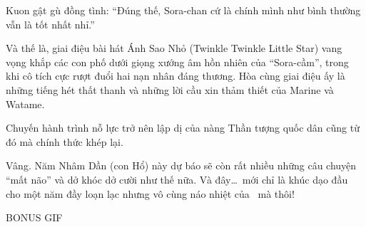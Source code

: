 \documentclass[../main.tex]{subfiles}
\begin{document}
Kuon gật gù đồng tình: ``Đúng thế, Sora-chan cứ là chính mình như bình thường vẫn là tốt nhất nhỉ.''

Và thế là, giai điệu bài hát Ánh Sao Nhỏ (Twinkle Twinkle Little Star) vang vọng khắp các con phố dưới giọng xướng âm hồn nhiên của ``Sora-cầm'', trong khi cô tích cực rượt đuổi hai nạn nhân đáng thương. Hòa cùng giai điệu ấy là những tiếng hét thất thanh và những lời cầu xin thảm thiết của Marine và Watame.

Chuyến hành trình nỗ lực trở nên lập dị của nàng Thần tượng quốc dân cũng từ đó mà chính thức khép lại.

Vâng. Năm Nhâm Dần (con Hổ) này dự báo sẽ còn rất nhiều những câu chuyện ``mất não'' và dở khóc dở cười như thế nữa. Và đây\dots\ mới chỉ là khúc dạo đầu cho một năm đầy loạn lạc nhưng vô cùng náo nhiệt của \hll\ mà thôi!

\begin{center}
  {\ab BONUS GIF}
\end{center}
\end{document}

